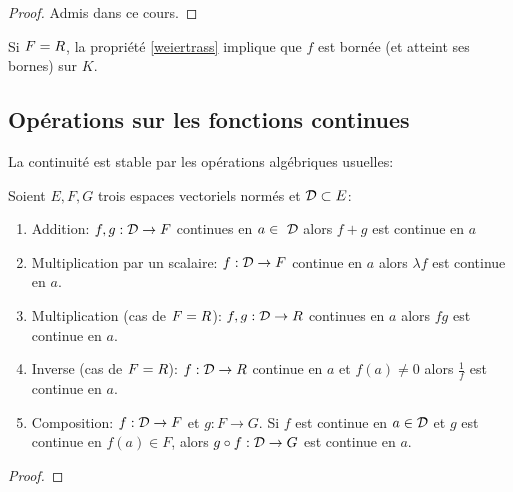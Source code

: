 \begin{proof}
    Admis dans ce cours.
\end{proof}

\begin{remark}
    Si $F = R$, la propriété \ref{weiertrass} implique que $f$ est bornée (et atteint ses bornes) sur $K$. 
\end{remark}

\sld{\vfill\pagebreak[5]}%
\subsection{Opérations sur les fonctions continues}

La continuité est stable par les opérations algébriques usuelles:
\begin{proposition} Soient $E,F,G$ trois espaces vectoriels normés et $\mathcal{D} \subset E$: 
    \begin{enumerate}[label=$(\roman*)$]
        \item Addition: $f,g: \mathcal{D} \to F$ continues en $a\in  \D$ alors $f+g$ est continue en $a$ 
        \item Multiplication par un scalaire: $f:\mathcal{D}\to F$ continue en $a$ alors $\lambda f$ est continue en $a$.
        \item Multiplication (cas de $F=R$): $f,g:\mathcal{D}\to R$ continues en $a$ alors $fg$ est continue en $a$.
        \item Inverse (cas de $F=R$): $f:\mathcal{D}\to R$ continue en $a$ et $f(a) \neq 0$ alors $\frac{1}{f}$ est continue en $a$.
        \item Composition: $f: \mathcal{D} \to F$ et $g: F \to G $. Si $f$ est continue en $a \in \D$ et $g$ est continue en $f(a)\in F$, alors $g\circ f:\mathcal{D} \to G$ est continue en $a$. 
    \end{enumerate}
\end{proposition}

\begin{proof}

\end{proof}

\begin{exemple}
    \pl{\rep{5cm}}
\end{exemple}

